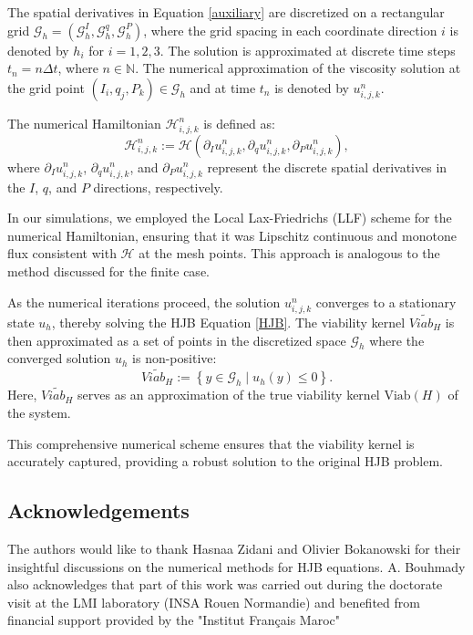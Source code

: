 \documentclass[]{interact}
\theoremstyle{plain}%
\theoremstyle{definition}
\theoremstyle{remark}
\begin{document}
The spatial derivatives in Equation \eqref{auxiliary} are discretized on a rectangular grid \(\mathcal{G}_h = (\mathcal{G}_h^I, \mathcal{G}_h^q, \mathcal{G}_h^P)\), where the grid spacing in each coordinate direction \(i\) is denoted by \(h_i\) for \(i = 1, 2, 3\). The solution is approximated at discrete time steps \( t_n = n \Delta t \), where \(n \in \mathbb{N}\). The numerical approximation of the viscosity solution at the grid point \((I_i, q_j, P_k) \in \mathcal{G}_h\) and at time \( t_n \) is denoted by \( u_{i,j,k}^n \).

The numerical Hamiltonian \(\mathcal{H}_{i,j,k}^n\) is defined as:
\[
\mathcal{H}_{i,j,k}^n := \mathcal{H}\left( \partial_I u_{i,j,k}^n, \partial_q u_{i,j,k}^n, \partial_P u_{i,j,k}^n \right),
\]
where \(\partial_I u_{i,j,k}^n\), \(\partial_q u_{i,j,k}^n\), and \(\partial_P u_{i,j,k}^n\) represent the discrete spatial derivatives in the \(I\), \(q\), and \(P\) directions, respectively.

In our simulations, we employed the Local Lax-Friedrichs (LLF) scheme for the numerical Hamiltonian, ensuring that it was Lipschitz continuous and monotone flux consistent with \( \mathcal{H} \) at the mesh points. This approach is analogous to the method discussed for the finite case.


As the numerical iterations proceed, the solution \( u^n_{i,j,k} \) converges to a stationary state \( u_h \), thereby solving the HJB Equation \eqref{HJB}. The viability kernel \( \tilde{Viab_H} \) is then approximated as a set of points in the discretized space \( \mathcal{G}_h \) where the converged solution \( u_h \) is non-positive:
\[
\tilde{Viab_H} := \left\{ y \in \mathcal{G}_h \mid u_h(y) \leq 0 \right\}.
\]
Here, \( \tilde{Viab_H} \) serves as an approximation of the true viability kernel \( \text{Viab}(H) \) of the system.

This comprehensive numerical scheme ensures that the viability kernel is accurately captured, providing a robust solution to the original HJB problem.


\subsection*{Acknowledgements}

The authors would like to thank Hasnaa Zidani and Olivier Bokanowski for their insightful discussions on the numerical methods for HJB equations. A. Bouhmady also acknowledges that part of this work was carried out during the doctorate visit at the LMI laboratory (INSA Rouen Normandie) and benefited from financial support provided by the "Institut Français Maroc"
\end{document}
